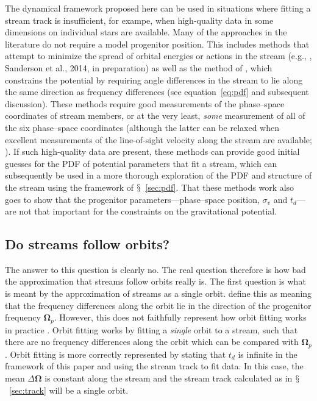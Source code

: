 \documentclass[12pt,preprint]{aastex}
\newcommand{\etal}{et al.}
\newcommand{\eg}{e.g.}
\newcommand{\eqnname}{equation}
\newcommand{\equationname}{\eqnname}
\newcommand{\sectionname}{$\mathsection$}
\renewcommand{\vec}[1]{\ensuremath{\mathbf{#1}}}
\newcommand{\veco}{\ensuremath{\vec{\Omega}}}
\newcommand{\sigv}{\ensuremath{\sigma_v}}
\begin{document}
The dynamical framework proposed here can be used in situations where
fitting a stream track is insufficient, for exampe, when high-quality
data in some dimensions on individual stars are available. Many of the
approaches in the literature do not require a model progenitor
position. This includes methods that attempt to minimize the spread of
orbital energies or actions in the stream (\eg,
\citealt{Binney08a,Penarrubia12a}, Sanderson \etal, 2014, in
preparation) as well as the method of \citet{Sanders13b}, which
constrains the potential by requiring angle differences in the stream
to lie along the same direction as frequency differences (see
\equationname~\ref{eq:pdf} and subsequent discussion). These methods
require good measurements of the phase--space coordinates of stream
members, or at the very least, \emph{some} measurement of all of the
six phase--space coordinates (although the latter can be relaxed when
excellent measurements of the line-of-sight velocity along the stream
are available; \citealt{Binney08a}). If such high-quality data are
present, these methods can provide good initial guesses for the PDF of
potential parameters that fit a stream, which can subsequently be used
in a more thorough exploration of the PDF and structure of the stream
using the framework of \sectionname~\ref{sec:pdf}. That these methods
work also goes to show that the progenitor parameters---phase--space
position, $\sigv$ and $t_d$---are not that important for the
constraints on the gravitational potential.

\subsection{Do streams follow orbits?}

The answer to this question is clearly no. The real question therefore
is how bad the approximation that streams follow orbits really is. The
first question is what is meant by the approximation of streams as a
single orbit. \citet{Sanders13a} define this as meaning that the
frequency differences along the orbit lie in the direction of the
progenitor frequency $\veco_p$. However, this does not faithfully
represent how orbit fitting works in practice
\citep[\eg,][]{Koposov10a}. Orbit fitting works by fitting a
\emph{single} orbit to a stream, such that there are no frequency
differences along the orbit which can be compared with
$\veco_p$. Orbit fitting is more correctly represented by stating that
$t_d$ is infinite in the framework of this paper and using the stream
track to fit data. In this case, the mean $\Delta \veco$ is constant
along the stream and the stream track calculated as in
\sectionname~\ref{sec:track} will be a single orbit.
\end{document}
